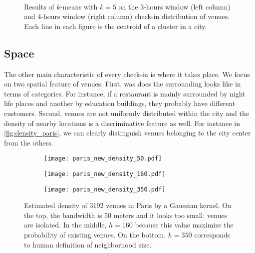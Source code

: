 \begin{figure}[p]
    \begin{subfigure}[b]{0.35\textwidth}
    \centering
    \iftoggle{EXTERNALPGF}{\texttt{[image: cluster\_day\_3h\_cl5]}}{}
    \end{subfigure}~
    \begin{subfigure}[b]{0.35\textwidth}
    \centering
    \iftoggle{EXTERNALPGF}{\texttt{[image: cluster\_day\_4h\_cl5]}}{}
    \end{subfigure}
    \caption[Venues cluster by time among all the cities]{
		Results of $k$-means with $k=5$ on the 3-hours window (left column) and 4-hours window (right column) check-in distribution of venues. 
Each line in each figure is the centroid of a cluster in a city.\label{fig:time_cluster_size}}
\end{figure}
\clearpage
\restoregeometry

\subsection{Space}

The other main characteristic of every check-in is where it takes place. We
focus on two spatial feature of venues. First, was does the surrounding looks
like in terms of categories. For instance, if a restaurant is mainly
surrounded by night life places and another by education buildings, they
probably have different customers. Second, venues are not uniformly
distributed within the city and the density of nearby locations is a
discriminative feature as well. For instance in \autoref{fig:density_paris},
we can clearly distinguish venues belonging to the city center from the
others.

\begin{figure}[h]
        \centering
    \begin{subfigure}[b]{0.32\textheight}
        \centering
        \texttt{[image: paris\_new\_density\_50.pdf]}
    \end{subfigure}
    \begin{subfigure}[b]{0.32\textheight}
	\texttt{[image: paris\_new\_density\_160.pdf]}
    \end{subfigure}
    \begin{subfigure}[b]{0.32\textheight}
        \centering
	\texttt{[image: paris\_new\_density\_350.pdf]}
    \end{subfigure}
\caption[Venue density in Paris]{Estimated density of 3192 venues in Paris by a
Gaussian kernel. On the top, the bandwidth is 50 meters and it looks too small:
venues are isolated. In the middle, $h=160$ because this value maximize the
probability of existing venues.  On the bottom, $h=350$ corresponds to human
definition of neighborhood size.\label{fig:density_paris}}
\end{figure}


